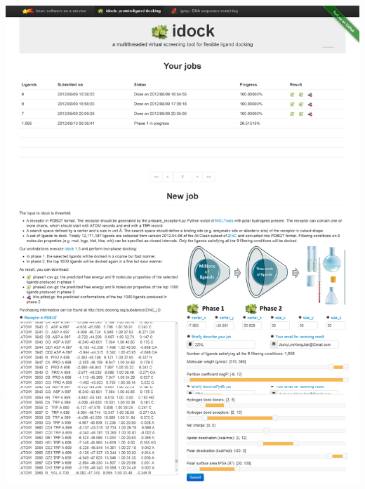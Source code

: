 \documentclass[12pt]{article}
\begin{document}
\begin{center}
\includegraphics[width=\linewidth,keepaspectratio=true]{idock.png}
\end{center}

\clearpage
\end{document}
